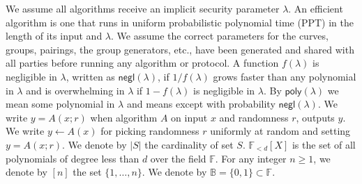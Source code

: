 \noindent We assume all algorithms receive an implicit security parameter $\lambda$. 
An efficient algorithm is one that runs in uniform probabilistic polynomial time (PPT) in the length of its input and $\lambda$. 
We assume the correct parameters for the curves, groups, pairings, the group generators, etc., have been generated and shared with all parties before running any algorithm or protocol. 
A function $f(\lambda)$ is negligible in $\lambda$, written as $\mathsf{negl}(\lambda)$, if $1/f(\lambda)$ grows faster than 
any polynomial in $\lambda$ and is overwhelming in $\lambda$ if $1-f(\lambda)$ is negligible in $\lambda$. By $\mathsf{poly}(\lambda)$ 
we mean some polynomial in $\lambda$ and \ewnp means except with probability $\mathsf{negl}(\lambda)$.
We write $y = A(x; r)$ when algorithm $A$ on input $x$ and randomness $r$, outputs $y$.
We write $y \leftarrow A(x)$ for picking randomness $r$ uniformly at random and setting $y = A(x; r)$. We denote by $|S|$ the cardinality of set $S$. 
$\mathbb{F}_{<d}[X]$ is the set of all polynomials of degree less than $d$ over the field $\mathbb{F}$. For any integer 
$n \geq 1$, we denote by $[n]$ the set $\{1, \ldots, n\}$. We denote by $\mathbb{B} = \{0,1\} \subset \mathbb{F}$.
\vspace{-0.015in}
